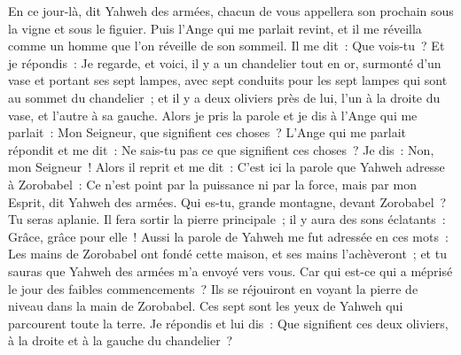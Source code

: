 \begin{multicols}{2}
En ce jour-là, dit Yahweh des armées, chacun de vous appellera son prochain sous la vigne et sous le figuier.
\VerseOne{}Puis l'Ange qui me parlait revint, et il me réveilla comme un homme que l'on réveille de son sommeil.
Il me dit~: Que vois-tu~? Et je répondis~: Je regarde, et voici, il y a un chandelier tout en or, surmonté d'un vase et portant ses sept lampes, avec sept conduits pour les sept lampes qui sont au sommet du chandelier~;
et il y a deux oliviers près de lui, l'un à la droite du vase, et l'autre à sa gauche.
Alors je pris la parole et je dis à l'Ange qui me parlait~: Mon Seigneur, que signifient ces choses~?
L'Ange qui me parlait répondit et me dit~: Ne sais-tu pas ce que signifient ces choses~? Je dis~: Non, mon Seigneur~!
Alors il reprit et me dit~: C'est ici la parole que Yahweh adresse à Zorobabel~: Ce n'est point par la puissance ni par la force, mais par mon Esprit, dit Yahweh des armées.
Qui es-tu, grande montagne, devant Zorobabel~? Tu seras aplanie. Il fera sortir la pierre principale~; il y aura des sons éclatants~: Grâce, grâce pour elle~!
Aussi la parole de Yahweh me fut adressée en ces mots~:
Les mains de Zorobabel ont fondé cette maison, et ses mains l'achèveront~; et tu sauras que Yahweh des armées m'a envoyé vers vous.
Car qui est-ce qui a méprisé le jour des faibles commencements~? Ils se réjouiront en voyant la pierre de niveau dans la main de Zorobabel. Ces sept sont les yeux de Yahweh qui parcourent toute la terre.
Je répondis et lui dis~: Que signifient ces deux oliviers, à la droite et à la gauche du chandelier~?

\end{multicols}
